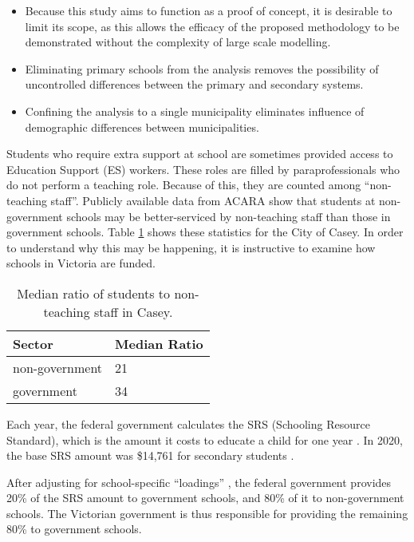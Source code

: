 \documentclass[11pt, a4paper]{article}
\begin{document}
    \begin{itemize}
        \item Because this study aims to function as a proof of concept, it is desirable to limit its scope, as this allows the efficacy of the proposed methodology to be demonstrated without the complexity of large scale modelling.
        \item Eliminating primary schools from the analysis removes the possibility of uncontrolled differences between the primary and secondary systems.
        \item Confining the analysis to a single municipality eliminates influence of demographic differences between municipalities.  
    \end{itemize}

    Students who require extra support at school are sometimes provided access to Education Support (ES) workers. These roles are filled by paraprofessionals who do not perform a teaching role. Because of this, they are counted among ``non-teaching staff''. Publicly available data from ACARA \parencite{acara_profiles} show that students at non-government schools may be better-serviced by non-teaching staff than those in government schools. Table \ref{es_staff_ratios} shows these statistics for the City of Casey. In order to understand why this may be happening, it is instructive to examine how schools in Victoria are funded.

    \begin{table}[!ht]
        \centering
        \caption{Median ratio of students to non-teaching staff in Casey.}
        \begin{tabular}{|l|l|}
            \hline
            Sector          & Median Ratio  \\ \hline
            non-government  & 21            \\ \hline
            government      & 34            \\ \hline
        \end{tabular}
        \label{es_staff_ratios}
    \end{table}

    Each year, the federal government calculates the SRS (Schooling Resource Standard), which is the amount it costs to educate a child for one year \parencite{srs_background}. In 2020, the base SRS amount was \$14,761 for secondary students \parencite{srs_2020}.

    After adjusting for school-specific ``loadings'' \parencite{srs_2020}, the federal government provides 20\% of the SRS amount to government schools, and 80\% of it to non-government schools. The Victorian government is thus responsible for providing the remaining 80\% to government schools.
\end{document}
